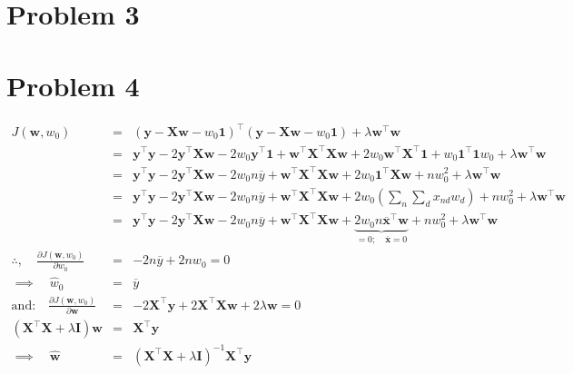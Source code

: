 \documentclass[11pt,twoside]{article}
\newcommand{\lt}{\left}
\newcommand{\rt}{\right}
\newcommand{\?}{\stackrel{?}{=}}
\newcommand{\ol}{\overline}
\newcommand{\bl}{\color{blue!80!black}}
\newcommand{\la}{\lambda}
\newcommand{\pd}[2]{\frac{\partial{#1}}{\partial{#2}}}
\newenvironment{solution}
{\medskip\par\begin{adjustwidth}{.01\textwidth}{.01\textwidth}\bl}{\medskip\end{adjustwidth}}
\begin{document}
\section*{Problem 3 }




 \section*{Problem 4 }
\begin{solution}
  \begin{eqnarray*}
  J(\bm w, w_0) &=& (\bm y - \bm X\bm w - w_0\bm 1)^\top (\bm y - \bm X\bm w - w_0\bm 1) + \la \bm w^\top  \bm w \\
&=& \bm y^\top \bm y - 2\bm y^\top  \bm X\bm w - 2w_0 \bm y^\top  \bm 1 + \bm w^\top \bm X^\top  \bm X\bm w + 2w_0 \bm w^\top  \bm X^\top  \bm 1 + w_0\bm 1^\top \bm 1 w_0 + \la \bm w^\top  \bm w \\
&=& \bm y^\top \bm y - 2\bm y^\top  \bm X\bm w - 2w_0 n \ol{y}  + \bm w^\top \bm X^\top  \bm X\bm w + 2w_0 \bm 1 ^\top  \bm X\bm w + n w_0^2 + \la \bm w^\top  \bm w \\
&=& \bm y^\top \bm y - 2\bm y^\top  \bm X\bm w - 2w_0 n \ol{y}  + \bm w^\top \bm X^\top  \bm X\bm w + 
2w_0   \lt( \sum_n \sum_d x_{nd} w_d \rt) + n w_0^2 + \la \bm w^\top  \bm w \\
&=& \bm y^\top \bm y - 2\bm y^\top  \bm X\bm w - 2w_0 n \ol{y}  + \bm w^\top \bm X^\top  \bm X\bm w + 
\underbrace{2w_0 n\ol{\bm x}^\top \bm w}_{=0;\quad  \ol{\bm x}=0} + n w_0^2 + \la \bm w^\top  \bm w \\
\therefore, \quad \pd{J(\bm w, w_0)}{w_0} &=& -2n\ol{y}  + 2nw_0 = 0 \\
\implies \quad \hat w_0 &=& \ol{y} \\
\text{and:} \quad \pd{J(\bm w, w_0)}{\bm w} &=& -2\bm X^\top  \bm y + 2\bm X^\top  \bm X\bm w + 2\la \bm w = 0 \\
(\bm X^\top \bm X + \la \bm I)\bm w &=& \bm X^\top  \bm y \\
\implies \quad \hat{\bm w} &=& (\bm X^\top  \bm X + \la \bm I)^{-1}\bm X^\top  \bm y  
\end{eqnarray*}

\end{solution}
\end{document}
